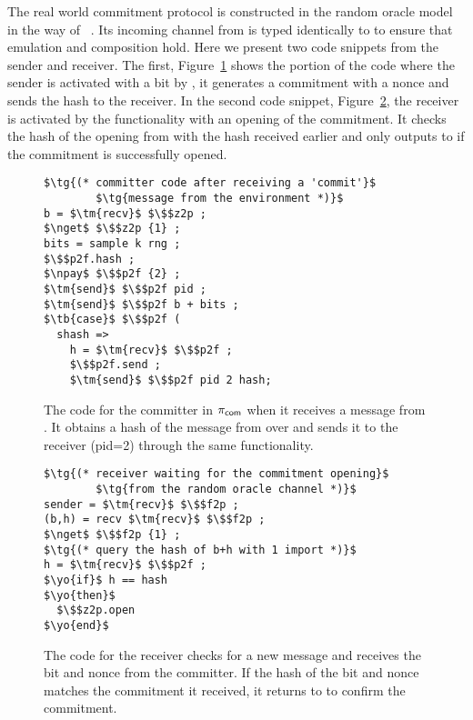 The real world commitment protocol is constructed in the random oracle model in the way of ~\cite{hofheinzcommitment}.
Its incoming channel from \Z is typed identically to \Fcom to ensure that emulation and composition hold.
Here we present two code snippets from the sender and receiver.
The first, Figure~\ref{lst:committer} shows the portion of the code where
the sender is activated with a bit by \Z, it generates a commitment with a nonce and sends the hash to the receiver.
In the second code snippet, Figure~\ref{lst:receiver}, the receiver is activated by the functionality with an opening of the commitment. It checks the hash of the opening from \Fro with the hash received earlier and only outputs to \Z if the commitment is successfully opened. 

\begin{figure}
\begin{lstlisting}[basicstyle=\footnotesize\BeraMonottFamily, frame=single, mathescape]
$\tg{(* committer code after receiving a 'commit'}$
        $\tg{message from the environment *)}$
b = $\tm{recv}$ $\$$z2p ;
$\nget$ $\$$z2p {1} ;
bits = sample k rng ;
$\$$p2f.hash ;
$\npay$ $\$$p2f {2} ;
$\tm{send}$ $\$$p2f pid ;
$\tm{send}$ $\$$p2f b + bits ;
$\tb{case}$ $\$$p2f (
  shash => 
    h = $\tm{recv}$ $\$$p2f ;
    $\$$p2f.send ;
    $\tm{send}$ $\$$p2f pid 2 hash;
\end{lstlisting}
\caption{The code for the committer in $\pi_{{\mathsf {com}}}$ when it receives a  message from \Z. It obtains a hash of the message from \Fropp over  and sends it to the receiver (pid=2) through the same functionality.}
\label{lst:committer}
\vspace{-2mm}
\end{figure}
\begin{figure}
\begin{lstlisting}[basicstyle=\footnotesize\BeraMonottFamily, frame=single, mathescape]
$\tg{(* receiver waiting for the commitment opening}$
        $\tg{from the random oracle channel *)}$
sender = $\tm{recv}$ $\$$f2p ;
(b,h) = recv $\tm{recv}$ $\$$f2p ;
$\nget$ $\$$f2p {1} ; 
$\tg{(* query the hash of b+h with 1 import *)}$
h = $\tm{recv}$ $\$$p2f ;
$\yo{if}$ h == hash
$\yo{then}$
  $\$$z2p.open
$\yo{end}$
\end{lstlisting}
\caption{The code for the receiver checks for a new message and receives the bit and nonce from the committer. If the hash of the bit and nonce matches the commitment it received, it returns  to \Z to confirm the commitment.}
\label{lst:receiver}
\vspace{-3mm}
\end{figure}

